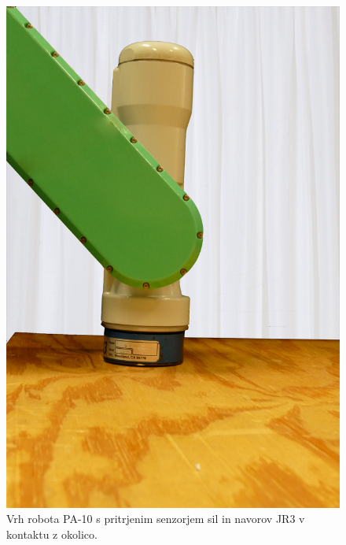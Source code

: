 \begin{figure}
	\centering
	\includegraphics[scale = 0.25]{./Slike/pa10jr3.png}
	\caption{Vrh robota PA-10 s pritrjenim senzorjem sil in navorov JR3 v kontaktu z okolico.}
	\label{fig:pa10jr3}
\end{figure}
